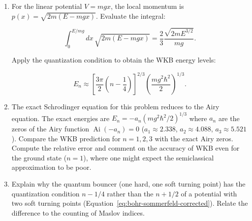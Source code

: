 \begin{problemset}
\begin{enumerate}
\item[(c)] For the linear potential $V = mgx$, the local momentum is $p(x) = \sqrt{2m(E - mgx)}$. Evaluate the integral:
\begin{linenomath}
\begin{equation}
\int_0^{E/mg} dx\,\sqrt{2m(E - mgx)} = \frac{2}{3}\frac{\sqrt{2mE^{3/2}}}{mg}.
\end{equation}
\end{linenomath}
Apply the quantization condition to obtain the WKB energy levels:
\begin{linenomath}
\begin{equation}
E_n \approx \left[\frac{3\pi}{2}\left(n - \frac{1}{4}\right)\right]^{2/3}
\left(\frac{mg^2\hbar^2}{2}\right)^{1/3}.
\end{equation}
\end{linenomath}

\item[(d)] The exact Schrodinger equation for this problem reduces to the Airy equation. The exact energies are $E_n = -a_n (mg^2\hbar^2/2)^{1/3}$ where $a_n$ are the zeros of the Airy function $\operatorname{Ai}(-a_n) = 0$ ($a_1 \approx 2.338$, $a_2 \approx 4.088$, $a_3 \approx 5.521$). Compare the WKB prediction for $n=1,2,3$ with the exact Airy zeros. Compute the relative error and comment on the accuracy of WKB even for the ground state ($n=1$), where one might expect the semiclassical approximation to be poor.

\item[(e)] Explain why the quantum bouncer (one hard, one soft turning point) has the quantization condition $n-1/4$ rather than the $n+1/2$ of a potential with two soft turning points (Equation~\eqref{eq:bohr-sommerfeld-corrected}). Relate the difference to the counting of Maslov indices.
\end{enumerate}

\end{problemset}


